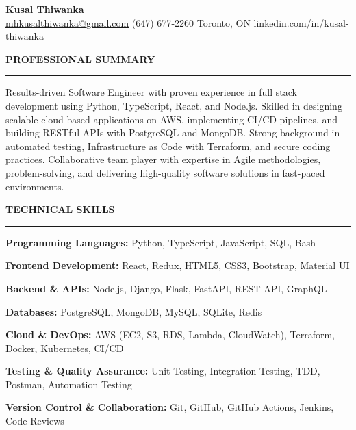 \documentclass[10pt,letterpaper]{article}
\begin{document}
\begin{center}
{\LARGE\textbf{Kusal Thiwanka}}\\[3pt]
\href{mailto:mhkusalthiwanka@gmail.com}{mhkusalthiwanka@gmail.com}\hspace{2em}%
(647) 677{-}2260\hspace{2em}%
Toronto, ON\hspace{2em}
linkedin.com/in/kusal-thiwanka
\end{center}

\vspace{6pt}

\textbf{PROFESSIONAL SUMMARY}\\[-8pt]
\noindent\rule{\textwidth}{1pt}

\vspace{-2pt}

Results-driven Software Engineer with proven experience in full stack development using Python, TypeScript, React, and Node.js. Skilled in designing scalable cloud-based applications on AWS, implementing CI/CD pipelines, and building RESTful APIs with PostgreSQL and MongoDB. Strong background in automated testing, Infrastructure as Code with Terraform, and secure coding practices. Collaborative team player with expertise in Agile methodologies, problem-solving, and delivering high-quality software solutions in fast-paced environments.

\vspace{8pt}

\textbf{TECHNICAL SKILLS}\\[-8pt]
\noindent\rule{\textwidth}{1pt}

\vspace{-2pt}

\textbf{Programming Languages:} Python, TypeScript, JavaScript, SQL, Bash

\textbf{Frontend Development:} React, Redux, HTML5, CSS3, Bootstrap, Material UI

\textbf{Backend \& APIs:} Node.js, Django, Flask, FastAPI, REST API, GraphQL

\textbf{Databases:} PostgreSQL, MongoDB, MySQL, SQLite, Redis

\textbf{Cloud \& DevOps:} AWS (EC2, S3, RDS, Lambda, CloudWatch), Terraform, Docker, Kubernetes, CI/CD

\textbf{Testing \& Quality Assurance:} Unit Testing, Integration Testing, TDD, Postman, Automation Testing

\textbf{Version Control \& Collaboration:} Git, GitHub, GitHub Actions, Jenkins, Code Reviews
\end{document}
